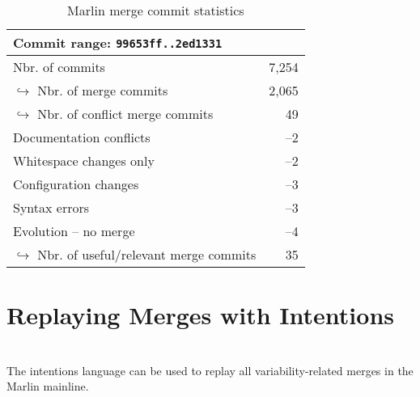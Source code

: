 \begin{table}[h]
    \centering
    \caption{Marlin merge commit statistics}
    \label{tab:marlinmerge}
    \begin{tabular}{l r}
    \hline\hline
        Commit range: \texttt{99653ff..2ed1331}& \\\hline
        Nbr. of commits & 7,254\\
        $\hookrightarrow$ Nbr. of merge commits & 2,065 \\
        \hspace{1em}$\hookrightarrow$ Nbr. of conflict merge commits & 49 \\
        \hspace{1em}Documentation conflicts & --2\\
        \hspace{1em}Whitespace changes only & --2\\
        \hspace{1em}Configuration changes & --3\\
        \hspace{1em}Syntax errors & --3\\
        \hspace{1em}Evolution -- no merge & --4\\
        \hspace{2em}$\hookrightarrow$ Nbr. of useful/relevant merge commits & 35\\
    \hline\hline
    \end{tabular}
\end{table}

\section{Replaying Merges with Intentions}


\section{\RQA}
The intentions language can be used to replay all variability-related merges in the Marlin mainline.

